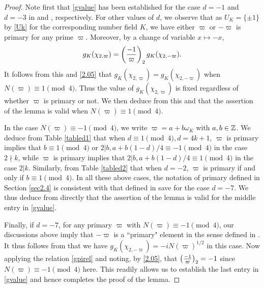 \documentclass[twoside,leqno,10pt, A4]{amsart}
\begin{document}
\begin{proof}
  Note first that \eqref{gvalue} has been established for the case $d=-1$ and $d=-3$ in \cite[Lemma 2.2]{G&Zhao4} and \cite[Lemma 2.3]{G&Zhao3}, respectively. For other values of $d$, we observe that as $U_K=\{ \pm 1\}$  by \eqref{Uk} for the corresponding number field $K$, we have either $\varpi$ or $-\varpi$ is primary for any prime $\varpi$. Moreover, by a change of variable $x \mapsto -x$,
\begin{align}
\label{gpirel}
   g_K(\chi_{2,\varpi})= \left(\frac{-1}{\varpi}\right)_2g_K(\chi_{2,-\varpi}).
\end{align}
 It follows from this and \eqref{2.05} that $g_K(\chi_{2,\varpi})= g_K(\chi_{2,-\varpi})$ when $N(\varpi) \equiv 1 \pmod 4$. Thus the value of $g_K(\chi_{2,\varpi})$ is fixed regardless of whether $\varpi$ is primary or not.  We then deduce from this and \cite[Lemma 2.1]{G&Zhao2022-4} that the assertion of the lemma is valid when $N(\varpi) \equiv 1 \pmod 4$. \newline

In the case $N(\varpi) \equiv -1 \pmod 4$, we write $\varpi=a+b\omega_K$ with $a, b \in \mathbb Z$. We deduce from Table \eqref{tabled1} that when $d \equiv 1 \pmod 4, d=4k+1$, $\varpi$ is primary implies that $b \equiv 1 \pmod 4$ or $2|b, a+b(1-d)/4 \equiv -1 \pmod 4$ in the case $2 \nmid k$, while $\varpi$ is primary implies that $2|b, a+b(1-d)/4 \equiv 1 \pmod 4$ in the case $2|k$. Similarly, from Table \eqref{tabled2} that when $d =-2$, $\varpi$ is primary if and only if $b \equiv 1 \pmod 4$. In all these above cases, the notation of primary defined in Section \ref{sec2.4} is consistent with that defined in \cite[Section 2.3]{G&Zhao2022-4} save for the case $d=-7$. We thus deduce from \cite[Lemma 2.1]{G&Zhao2022-4} directly that the assertion of the lemma is valid for the middle entry in \eqref{gvalue}. \newline

Finally, if $d=-7$, for any primary $\varpi$ with $N(\varpi) \equiv -1 \pmod 4$, our discussions above imply that $-\varpi$ is a ``primary" element in the sense defined in \cite[Section 2.3]{G&Zhao2022-4}. It thus follows from \cite[Lemma 2.1]{G&Zhao2022-4} that we have $g_K(\chi_{2,-\varpi})= -i N(\varpi)^{1/2}$ in this case. Now applying the relation \eqref{gpirel} and noting, by \eqref{2.05}, that $\left(\frac{-1}{\varpi}\right)_2=-1$ since $N(\varpi) \equiv -1 \pmod 4$ here. This readily allows us to establish the last entry in \eqref{gvalue} and hence completes the proof of the lemma.
\end{proof}
\end{document}
